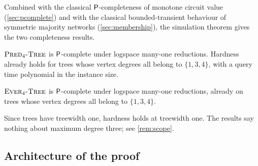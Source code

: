Combined with the classical $\mathsf{P}$-completeness of monotone circuit value (\cref{sec:pcomplete})
and with the classical bounded-transient behaviour of symmetric majority networks
(\cref{sec:membership}), the simulation theorem gives the two completeness results.

\begin{mainthm}\label{thmB}
$\textsc{Pred}_4\textsc{-Tree}$ is $\mathsf{P}$-complete under logspace many-one reductions. Hardness already holds for trees
whose vertex degrees all belong to $\{1,3,4\}$, with a query time polynomial in the instance size.
\end{mainthm}

\begin{mainthm}\label{thmC}
$\textsc{Ever}_4\textsc{-Tree}$ is $\mathsf{P}$-complete under logspace many-one reductions, already on trees whose vertex
degrees all belong to $\{1,3,4\}$.
\end{mainthm}

Since trees have treewidth one, hardness holds at treewidth one. The results say nothing about
maximum degree three; see \cref{rem:scope}.

\subsection{Architecture of the proof}\label{sec:architecture}

